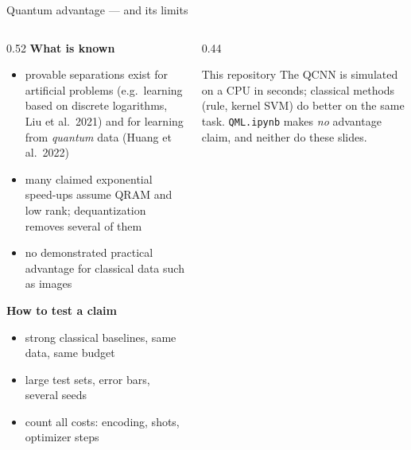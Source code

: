 \documentclass[aspectratio=169,11pt]{beamer}
\newcommand{\key}[1]{{\color{qdark}\textbf{#1}}}
\begin{document}
\begin{frame}[label=fAdv]{Quantum advantage --- and its limits}
  \begin{columns}[T]
    \begin{column}{0.52\textwidth}
      \small
      \key{What is known}
      \begin{itemize}\itemsep1pt\scriptsize
        \item provable separations exist for artificial problems (e.g.\ learning based on discrete logarithms, Liu et al.\ 2021) and for learning from
          \emph{quantum} data (Huang et al.\ 2022)
        \item many claimed exponential speed-ups assume QRAM and low rank; dequantization removes several of them
        \item no demonstrated practical advantage for classical data such as images
      \end{itemize}
      \key{How to test a claim}
      \begin{itemize}\itemsep1pt\scriptsize
        \item strong classical baselines, same data, same budget
        \item large test sets, error bars, several seeds
        \item count all costs: encoding, shots, optimizer steps
      \end{itemize}
    \end{column}
    \begin{column}{0.44\textwidth}
      \begin{alertblock}{This repository}
        \scriptsize The QCNN is simulated on a CPU in seconds; classical methods (rule, kernel SVM) do better on the same task. \texttt{QML.ipynb} makes
        \emph{no} advantage claim, and neither do these slides.
      \end{alertblock}
    \end{column}
  \end{columns}
\end{frame}
\end{document}

